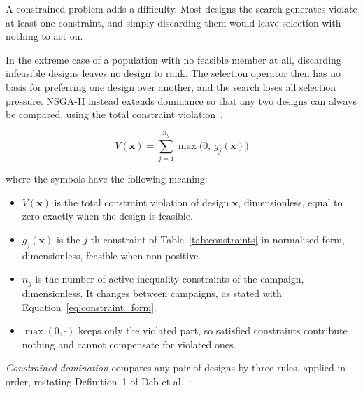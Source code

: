 A constrained problem adds a difficulty. Most designs the search
generates violate at least one constraint, and simply discarding them
would leave selection with nothing to act on.

In the extreme case of a population with no feasible member at all,
discarding infeasible designs leaves no design to rank. The selection
operator then has no basis for preferring one design over another, and
the search loses all selection pressure. NSGA-II instead extends
dominance so that any two designs can always be compared, using the
total constraint violation~\cite{deb_nsga2_2002}.

\begin{equation}
V(\mathbf{x}) = \sum_{j=1}^{n_g} \max\bigl( 0,\, g_j(\mathbf{x}) \bigr)
\label{eq:violation}
\end{equation}

\noindent where the symbols have the following meaning:

\begin{itemize}
  \item $V(\mathbf{x})$ is the total constraint violation of design
        $\mathbf{x}$, dimensionless, equal to zero exactly when the
        design is feasible.

  \item $g_j(\mathbf{x})$ is the $j$-th constraint of
        Table~\ref{tab:constraints} in normalised form, dimensionless,
        feasible when non-positive.

  \item $n_g$ is the number of active inequality constraints of the
        campaign, dimensionless. It changes between campaigns, as stated
        with Equation~\eqref{eq:constraint_form}.

  \item $\max(0, \cdot)$ keeps only the violated part, so satisfied
        constraints contribute nothing and cannot compensate for
        violated ones.
\end{itemize}

\emph{Constrained domination} compares any pair of designs by three
rules, applied in order, restating Definition~1 of
Deb et al.~\cite{deb_nsga2_2002}:

